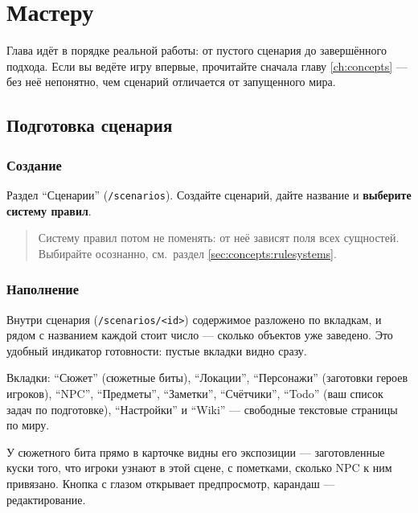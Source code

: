 \chapter{Мастеру}
\label{ch:master}

Глава идёт в порядке реальной работы: от пустого сценария до завершённого подхода. Если вы ведёте игру впервые, прочитайте сначала главу \ref{ch:concepts} --- без неё непонятно, чем сценарий отличается от запущенного мира.

\section{Подготовка сценария}
\label{sec:master:prepare}

\subsection{Создание}
Раздел ``Сценарии'' (\texttt{/scenarios}). Создайте сценарий, дайте название и \textbf{выберите систему правил}.

\begin{quote}
\small
Систему правил потом не поменять: от неё зависят поля всех сущностей. Выбирайте осознанно, см.\ раздел \ref{sec:concepts:rulesystems}.
\end{quote}


\subsection{Наполнение}
Внутри сценария (\texttt{/scenarios/<id>}) содержимое разложено по вкладкам, и рядом с названием каждой стоит число --- сколько объектов уже заведено. Это удобный индикатор готовности: пустые вкладки видно сразу.


Вкладки: ``Сюжет'' (сюжетные биты), ``Локации'', ``Персонажи'' (заготовки героев игроков), ``NPC'', ``Предметы'', ``Заметки'', ``Счётчики'', ``Todo'' (ваш список задач по подготовке), ``Настройки'' и ``Wiki'' --- свободные текстовые страницы по миру.

У сюжетного бита прямо в карточке видны его экспозиции --- заготовленные куски того, что игроки узнают в этой сцене, с пометками, сколько NPC к ним привязано. Кнопка с глазом открывает предпросмотр, карандаш --- редактирование.

